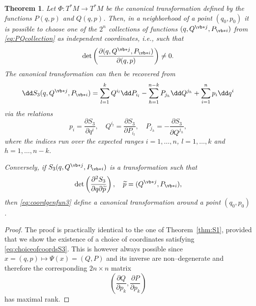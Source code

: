 \documentclass[english,fontsize=11pt,paper=b5]{scrbook}
\newtheorem{theorem}{Theorem}[chapter]
\theoremstyle{definition}
\begin{document}
    \begin{theorem}
      Let $\Phi:T^*M \to T^* M$ be the canonical transformation defined by the functions $P(q,p)$ and $Q(q,p)$.
      Then, in a neighborhood of a point $(q_0, p_0)$ it is possible to choose one of the $2^n$ collections of functions $(q, Q^{\vb* j}, P_{\vb* i})$ from \eqref{eq:PQcollection} as independent coordinates, i.e., such that
      \begin{equation}\label{eq:choiceofcoordsS3}
        \det\left(\frac{\partial (q, Q^{\vb* j}, P_{\vb* i})}{\partial(q,p)}\right) \neq 0.
      \end{equation}
      The canonical transformation can then be recovered from
      \begin{equation}
        \dd S_3(q, Q^{\vb* j}, P_{\vb* i}) = \sum_{l=1}^k Q^{i_l} \dd P_{i_l} -\sum_{h=1}^{n-k} P_{j_h} \dd Q^{j_h} + \sum_{i=1}^n p_i \dd q^i
      \end{equation}
      via the relations
      \begin{equation}\label{eq:coordgenfun3}
        p_i = \frac{\partial S_3}{\partial q^i}, \quad
        Q^{i_l} = \frac{\partial S_3}{\partial P_{i_l}}, \quad
        P_{j_h} = -\frac{\partial S_3}{\partial Q^{j_h}},
      \end{equation}
      where the indices run over the expected ranges $i=1,\ldots,n$, $l=1,\ldots,k$ and $h = 1,\ldots,n-k$.

      Conversely, if $S_3(q, Q^{\vb* j}, P_{\vb* i})$ is a transformation such that
      \begin{equation}
        \det\left(\frac{\partial^2 S_3}{\partial q \partial \widetilde p}\right), \quad \widetilde p = (Q^{\vb* j}, P_{\vb* i}),
      \end{equation}
      then \eqref{eq:coordgenfun3} define a canonical transformation around a point $(q_0, p_0)$.
    \end{theorem}

    \begin{proof}
      The proof is practically identical to the one of Theorem~\ref{thm:S1}, provided that we show the existence of a choice of coordinates satisfying \eqref{eq:choiceofcoordsS3}.
      This is however always possible since $x=(q,p) \mapsto \Psi(x) = (Q,P)$ and its inverse are non--degenerate and therefore the corresponding $2n\times n$ matrix
      \begin{equation}
        \left(\frac{\partial Q}{\partial p_k}, \frac{\partial P}{\partial p_k}\right)
      \end{equation}
      has maximal rank.
    \end{proof}
\end{document}
